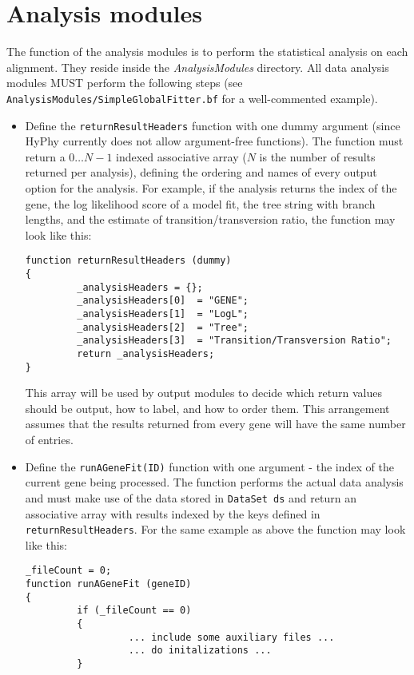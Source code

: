 \documentclass[12pt]{article}
\begin{document}
\section{Analysis modules}
 
The function of the analysis modules is to perform the statistical analysis on each alignment. 
They reside inside the \textit{AnalysisModules} directory. All data analysis modules MUST perform the following steps (see {\tt AnalysisModules/SimpleGlobalFitter.bf} for a well-commented example).

 \begin{itemize}
\item Define the {\tt returnResultHeaders} function with one dummy argument (since HyPhy currently does not allow argument-free functions).
The function must return a $0\ldots N-1$ indexed associative array ($N$ is the number of results returned per analysis), defining the ordering and names of every output option for the analysis. For example, if the analysis returns the index of the gene, the log likelihood score of a model fit, the tree string with branch lengths, and the estimate of transition/transversion ratio, the function may look like this:

\begin{verbatim}
function returnResultHeaders (dummy)
{
         _analysisHeaders = {};
         _analysisHeaders[0]  = "GENE";
         _analysisHeaders[1]  = "LogL";
         _analysisHeaders[2]  = "Tree";
         _analysisHeaders[3]  = "Transition/Transversion Ratio";
         return _analysisHeaders;
}
\end{verbatim}

This array will be used by output modules to decide which  return values should be output, how to label, and how to order them. This arrangement assumes that the results returned from every gene will have the same number of entries. 

\item Define the {\tt runAGeneFit(ID)} function with one argument - the index of the current gene being processed. The function performs the actual data analysis and must make use of the data stored in {\tt DataSet ds} and return an associative array with results indexed by the keys defined in {\tt returnResultHeaders}. For the same example as above the function may look like this:

\begin{verbatim}
_fileCount = 0;
function runAGeneFit (geneID)
{
         if (_fileCount == 0)
         {
                  ... include some auxiliary files ...
                  ... do initalizations ...
         }
	

\end{verbatim}
\end{itemize}
\end{document}
